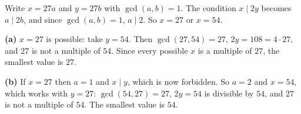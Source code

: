 Write $x=27a$ and $y=27b$ with $\gcd(a,b)=1$. The condition $x\mid2y$ becomes $a\mid2b$, and since $\gcd(a,b)=1$, $a\mid2$. So $x=27$ or $x=54$.

\textbf{(a)} $x=27$ is possible: take $y=54$. Then $\gcd(27,54)=27$, $2y=108=4\cdot27$, and $27$ is not a multiple of $54$. Since every possible $x$ is a multiple of $27$, the smallest value is $\boxed{27}$.

\textbf{(b)} If $x=27$ then $a=1$ and $x\mid y$, which is now forbidden. So $a=2$ and $x=54$, which works with $y=27$: $\gcd(54,27)=27$, $2y=54$ is divisible by $54$, and $27$ is not a multiple of $54$. The smallest value is $\boxed{54}$.

